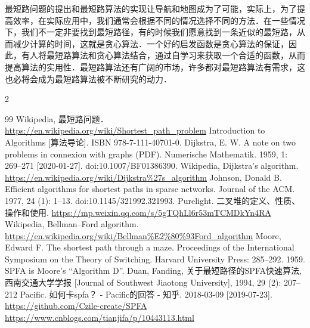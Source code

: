 \documentclass {article}
\begin{document}
最短路问题的提出和最短路算法的实现让导航和地图成为了可能，实际上，为了提高效率，在实际应用中，我们通常会根据不同的情况选择不同的方法．在一些情况下，我们不一定非要找到最短路径，有的时候我们愿意找到一条近似的最短路，从而减少计算的时间，这就是贪心算法．一个好的启发函数是贪心算法的保证，因此，有人将最短路算法和贪心算法结合，通过自学习来获取一个合适的函数，从而提高算法的实用性．最短路算法还有广阔的市场，许多都对最短路算法有需求，这也必将会成为最短路算法被不断研究的动力．


\begin {multicols} {2}
\begin {thebibliography}{99} 
 Wikipedia, 最短路问题．\url {https://en.wikipedia.org/wiki/Shortest_path_problem}
 Introduction to Algorithms [算法导论]. ISBN 978-7-111-40701-0.
 Dijkstra, E. W. A note on two problems in connexion with graphs (PDF). Numerische Mathematik. 1959, 1: 269–271 [2020-01-27]. doi:10.1007/BF01386390.
 Wikipedia, Dijkstra's algorithm. \url {https://en.wikipedia.org/wiki/Dijkstra%27s_algorithm}
 Johnson, Donald B. Efficient algorithms for shortest paths in sparse networks. Journal of the ACM. 1977, 24 (1): 1–13. doi:10.1145/321992.321993.
 Purelight. 二叉堆的定义、性质、操作和使用. \url {https://mp.weixin.qq.com/s/5gTQhLl6r53mTCMDkYn4RA}
 Wikipedia, Bellman–Ford algorithm. \url {https://en.wikipedia.org/wiki/Bellman%E2%80%93Ford_algorithm}
 Moore, Edward F. The shortest path through a maze. Proceedings of the International Symposium on the Theory of Switching. Harvard University Press: 285–292. 1959. SPFA is Moore's “Algorithm D”.
 Duan, Fanding, 关于最短路径的SPFA快速算法, 西南交通大学学报 [Journal of Southwest Jiaotong University], 1994, 29 (2): 207–212
 Pacific. 如何卡spfa？ - Pacific的回答 - 知乎. 2018-03-09 [2019-07-23].
 \url {https://github.com/Czile-create/SPFA}
 \url {https://www.cnblogs.com/tianjifa/p/10443113.html}
\end {thebibliography}
\end {multicols}
\end{document}
